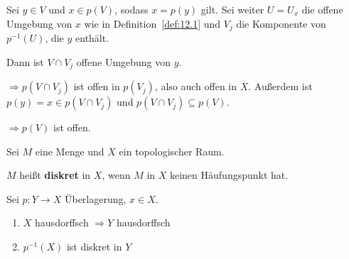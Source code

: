 \begin{beweis}
    Sei $y \in V$ und $x \in p(V)$, sodass $x=p(y)$ gilt.
    Sei weiter $U = U_x$ die offene Umgebung von $x$ wie in Definition~\ref{def:12.1}
    und $V_j$ die Komponente von $p^{-1}(U)$, die $y$ enthält.

    Dann ist $V \cap V_j$ offene Umgebung von $y$.

    $\Rightarrow p(V \cap V_j)$ ist offen in $p(V_j)$, also auch offen
    in $X$. Außerdem ist $p(y) = x \in p(V \cap V_j)$ und
    $p(V \cap V_j) \subseteq p(V)$.

    $\Rightarrow p(V)$ ist offen.
\end{beweis}

\begin{definition}
    Sei $M$ eine Menge und $X$ ein topologischer Raum.

    $M$ heißt \textbf{diskret} in $X$, wenn $M$ in $X$ keinen 
    Häufungspunkt hat.
\end{definition}

\begin{korollar} %
    Sei $p: Y \rightarrow X$ Überlagerung, $x \in X$.
    \begin{enumerate}[label=\alph*)]
        \item $X$ hausdorffsch $\Rightarrow Y$ hausdorffsch
        \item $p^{-1}(X)$ ist diskret in $Y$
    \end{enumerate}
\end{korollar}

